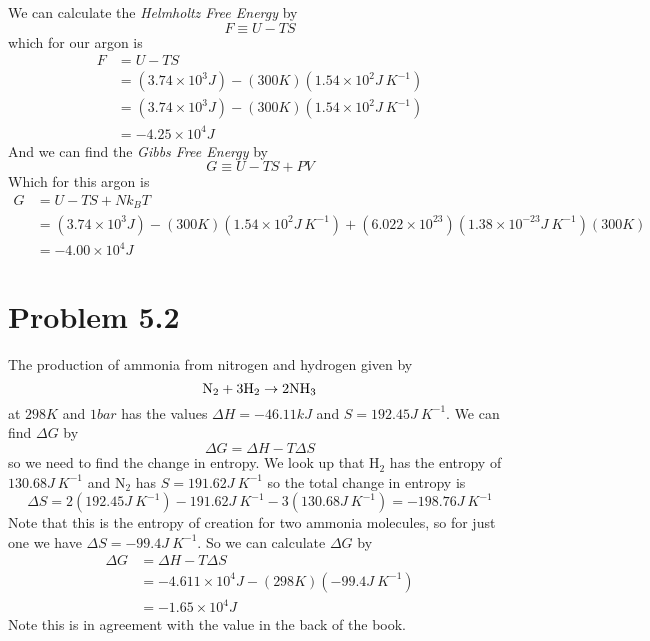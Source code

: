 \documentclass[11pt]{article}
\numberwithin{equation}{section}
\begin{document}
We can calculate the \emph{Helmholtz Free Energy} by
\begin{equation}
F\equiv U - TS
\label{Helm}
\end{equation}
which for our argon is
\begin{align*}
F &= U - TS\\
&=  (3.74\times10^{3}\unit{J})- (300\unit{K})(1.54\times10^{2}\unit{J\ K^{-1}})\\
&=  (3.74\times10^{3}\unit{J})- (300\unit{K})(1.54\times10^{2}\unit{J\ K^{-1}})\\
&= -4.25\times10^4\unit{J}
\end{align*}
And we can find the \emph{Gibbs Free Energy} by
\begin{equation}
G\equiv U - TS + PV
\label{Helm}
\end{equation}
Which for this argon is
\begin{align*}
G &= U - TS + Nk_BT\\
&=  (3.74\times10^{3}\unit{J})- (300\unit{K})(1.54\times10^{2}\unit{J\ K^{-1}}) + (6.022\times10^{23})(1.38\times10^{-23}\unit{J\ K^{-1}})(300\unit{K})\\
&= -4.00\times10^{4}\unit{J}
\end{align*}

\section{Problem 5.2}
The production of ammonia from nitrogen and hydrogen given by
$$\textnormal{N}_2 + 3\textnormal{H}_2 \rightarrow 2\textnormal{NH}_3$$
at $298\unit{K}$ and $1\unit{bar}$ has the values $\Delta H = -46.11\unit{kJ}$ and $S = 192.45\unit{J\ K^{-1}}$. We can find $\Delta G$ by
$$\Delta G = \Delta H - T\Delta S$$
so we need to find the change in entropy. We look up that H$_2$ has the entropy of $130.68\unit{J\ K^{-1}}$ and N$_2$ has $S = 191.62\unit{J\ K^{-1}}$ so the total change in entropy is 
$$\Delta S = 2(192.45\unit{J\ K^{-1}}) - 191.62\unit{J\ K^{-1}} - 3(130.68\unit{J\ K^{-1}}) = -198.76\unit{J\ K^{-1}}$$
Note that this is the entropy of creation for two ammonia molecules, so for just one we have $\Delta S = -99.4\unit{J\ K^{-1}}$. So we can calculate $\Delta G$ by
\begin{align*}
\Delta G &= \Delta H - T\Delta S\\
&= -4.611\times10^{4}\unit{J} - (298\unit{K})(-99.4\unit{J\ K^{-1}})\\
&= -1.65\times10^{4}\unit{J}
\end{align*}
Note this is in agreement with the value in the back of the book.
\end{document}
